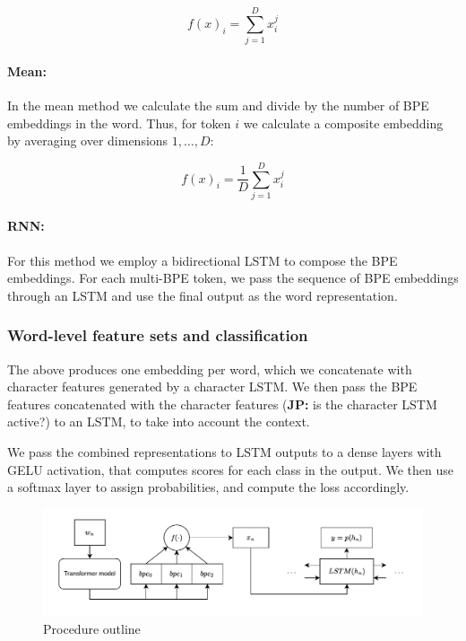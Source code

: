 \documentclass[11pt]{article}
\newcommand\jp[1]{(\textbf{JP:} #1)}
\begin{document}
	\begin{equation}
	f(x)_i = \sum_{j=1}^{D} x_i^j
	\end{equation}
	

    	\paragraph{Mean:} In the mean method we calculate the sum and
     divide by the number of BPE embeddings in the word. Thus, for
     token $i$ we calculate a composite embedding by averaging over
     dimensions $1,\ldots,D$:
	
	\begin{equation}
	f(x)_{i} = \frac{1}{D}\sum_{j=1}^{D} x_i^j
	\end{equation}
	
	
	\paragraph{RNN:} For this method we employ a bidirectional LSTM
        to compose the BPE embeddings. For each multi-BPE
        token, we pass the sequence of BPE embeddings through an LSTM
        and use the final output as the word representation. 
        
        \subsubsection{Word-level feature sets and classification}
        The above produces one embedding per word, which we
        concatenate with character features generated by a character
        LSTM. 
        We then pass the BPE features concatenated with the character
        features \jp{is the character LSTM active?} to an LSTM, to take
        into account the context.

        We pass the combined representations to LSTM outputs to a
        dense layers with GELU activation, that computes scores
        for each class in the output. We then use a softmax layer to
        assign probabilities, and compute the loss accordingly.

	\begin{figure}%
		\centering
		\includegraphics[scale=0.5]{single_step.pdf}
		\caption{\label{fig:model} Procedure outline}
	\end{figure}
\end{document}
